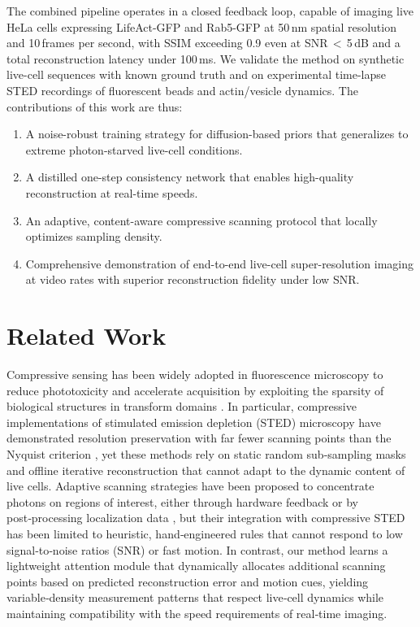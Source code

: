 \documentclass{article}
\begin{document}
The combined pipeline operates in a closed feedback loop, capable of imaging live HeLa cells expressing LifeAct-GFP and Rab5-GFP at 50\,nm spatial resolution and 10\,frames per second, with SSIM exceeding 0.9 even at SNR\,$<\,$5\,dB and a total reconstruction latency under 100\,ms. We validate the method on synthetic live-cell sequences with known ground truth and on experimental time-lapse STED recordings of fluorescent beads and actin/vesicle dynamics. The contributions of this work are thus:
\begin{enumerate}
    \item A noise-robust training strategy for diffusion-based priors that generalizes to extreme photon-starved live-cell conditions.
    \item A distilled one-step consistency network that enables high-quality reconstruction at real-time speeds.
    \item An adaptive, content-aware compressive scanning protocol that locally optimizes sampling density.
    \item Comprehensive demonstration of end-to-end live-cell super-resolution imaging at video rates with superior reconstruction fidelity under low SNR.
\end{enumerate}

\section{Related Work}

Compressive sensing has been widely adopted in fluorescence microscopy to reduce phototoxicity and accelerate acquisition by exploiting the sparsity of biological structures in transform domains \cite{marim2019compressive}. In particular, compressive implementations of stimulated emission depletion (STED) microscopy have demonstrated resolution preservation with far fewer scanning points than the Nyquist criterion \cite{tortarolo2019compressive}, yet these methods rely on static random sub‑sampling masks and offline iterative reconstruction that cannot adapt to the dynamic content of live cells. Adaptive scanning strategies have been proposed to concentrate photons on regions of interest, either through hardware feedback \cite{conchello2010adaptive} or by post‑processing localization data \cite{shechtman2014adaptive}, but their integration with compressive STED has been limited to heuristic, hand‑engineered rules that cannot respond to low signal‑to‑noise ratios (SNR) or fast motion. In contrast, our method learns a lightweight attention module that dynamically allocates additional scanning points based on predicted reconstruction error and motion cues, yielding variable‑density measurement patterns that respect live‑cell dynamics while maintaining compatibility with the speed requirements of real‑time imaging.
\end{document}
